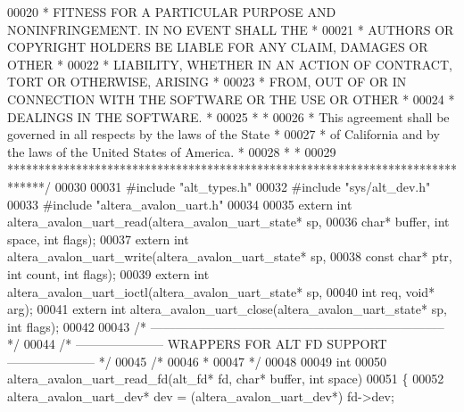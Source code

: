 \begin{DoxyCode}
00020 \textcolor{comment}{* FITNESS FOR A PARTICULAR PURPOSE AND NONINFRINGEMENT. IN NO EVENT SHALL THE *}
00021 \textcolor{comment}{* AUTHORS OR COPYRIGHT HOLDERS BE LIABLE FOR ANY CLAIM, DAMAGES OR OTHER      *}
00022 \textcolor{comment}{* LIABILITY, WHETHER IN AN ACTION OF CONTRACT, TORT OR OTHERWISE, ARISING     *}
00023 \textcolor{comment}{* FROM, OUT OF OR IN CONNECTION WITH THE SOFTWARE OR THE USE OR OTHER         *}
00024 \textcolor{comment}{* DEALINGS IN THE SOFTWARE.                                                   *}
00025 \textcolor{comment}{*                                                                             *}
00026 \textcolor{comment}{* This agreement shall be governed in all respects by the laws of the State   *}
00027 \textcolor{comment}{* of California and by the laws of the United States of America.              *}
00028 \textcolor{comment}{*                                                                             *}
00029 \textcolor{comment}{******************************************************************************/}
00030 
00031 \textcolor{preprocessor}{#include "alt_types.h"}
00032 \textcolor{preprocessor}{#include "sys/alt_dev.h"}
00033 \textcolor{preprocessor}{#include "altera_avalon_uart.h"}
00034 
00035 \textcolor{keyword}{extern} \textcolor{keywordtype}{int} altera_avalon_uart_read(altera_avalon_uart_state* sp,
00036   \textcolor{keywordtype}{char}* buffer, \textcolor{keywordtype}{int} space, \textcolor{keywordtype}{int} flags);
00037 \textcolor{keyword}{extern} \textcolor{keywordtype}{int} altera_avalon_uart_write(altera_avalon_uart_state* sp,
00038   \textcolor{keyword}{const} \textcolor{keywordtype}{char}* ptr, \textcolor{keywordtype}{int} count, \textcolor{keywordtype}{int} flags);
00039 \textcolor{keyword}{extern} \textcolor{keywordtype}{int} altera_avalon_uart_ioctl(altera_avalon_uart_state* sp,
00040   \textcolor{keywordtype}{int} req, \textcolor{keywordtype}{void}* arg);
00041 \textcolor{keyword}{extern} \textcolor{keywordtype}{int} altera_avalon_uart_close(altera_avalon_uart_state* sp, \textcolor{keywordtype}{int} flags);
00042 
00043 \textcolor{comment}{/* ----------------------------------------------------------------------- */}
00044 \textcolor{comment}{/* --------------------- WRAPPERS FOR ALT FD SUPPORT --------------------- */}
00045 \textcolor{comment}{/*}
00046 \textcolor{comment}{ *}
00047 \textcolor{comment}{ */}
00048 
00049 \textcolor{keywordtype}{int} 
00050 altera_avalon_uart_read_fd(alt_fd* fd, \textcolor{keywordtype}{char}* buffer, \textcolor{keywordtype}{int} space)
00051 \{
00052     altera_avalon_uart_dev* dev = (altera_avalon_uart_dev*) fd->dev; 

\end{DoxyCode}
